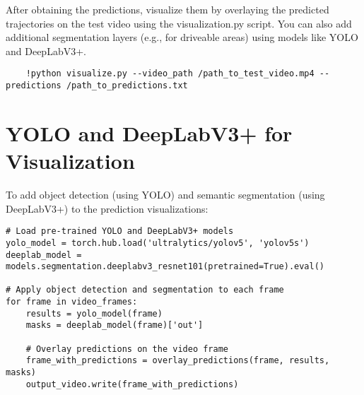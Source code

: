 After obtaining the predictions, visualize them by overlaying the predicted trajectories on the test video using the visualization.py script. You can also add additional segmentation layers (e.g., for driveable areas) using models like YOLO and DeepLabV3+.

\begin{small}
    
\begin{verbatim}
    !python visualize.py --video_path /path_to_test_video.mp4 --predictions /path_to_predictions.txt
\end{verbatim}
\end{small}

\section{YOLO and DeepLabV3+ for Visualization}

To add object detection (using YOLO) and semantic segmentation (using DeepLabV3+) to the prediction visualizations:

\begin{verbatim}
# Load pre-trained YOLO and DeepLabV3+ models
yolo_model = torch.hub.load('ultralytics/yolov5', 'yolov5s')
deeplab_model = models.segmentation.deeplabv3_resnet101(pretrained=True).eval()

# Apply object detection and segmentation to each frame
for frame in video_frames:
    results = yolo_model(frame)
    masks = deeplab_model(frame)['out']
    
    # Overlay predictions on the video frame
    frame_with_predictions = overlay_predictions(frame, results, masks)
    output_video.write(frame_with_predictions)

\end{verbatim}